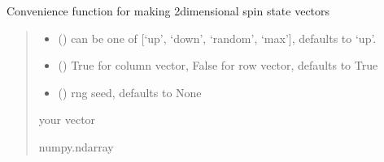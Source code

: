 \documentclass[letterpaper,10pt,english]{sphinxmanual}
\begin{document}
\begin{fulllineitems}
\label{\detokenize{spinbox:spinbox.extras.spinor2}}
\pysigstartsignatures
{}
\pysigstopsignatures
\sphinxAtStartPar
Convenience function for making 2\sphinxhyphen{}dimensional spin state vectors
\begin{quote}\begin{description}
\begin{itemize}
\item {} 
\sphinxAtStartPar
{} (\sphinxstyleliteralemphasis{\sphinxupquote{, }}) \textendash{} can be one of {[}‘up’, ‘down’, ‘random’, ‘max’{]}, defaults to ‘up’.

\item {} 
\sphinxAtStartPar
{} (\sphinxstyleliteralemphasis{\sphinxupquote{, }}) \textendash{} True for column vector, False for row vector, defaults to True

\item {} 
\sphinxAtStartPar
{} (\sphinxstyleliteralemphasis{\sphinxupquote{, }}) \textendash{} rng seed, defaults to None

\end{itemize}

\sphinxAtStartPar
your vector

\sphinxAtStartPar
numpy.ndarray

\end{description}\end{quote}

\end{fulllineitems}

\end{document}
